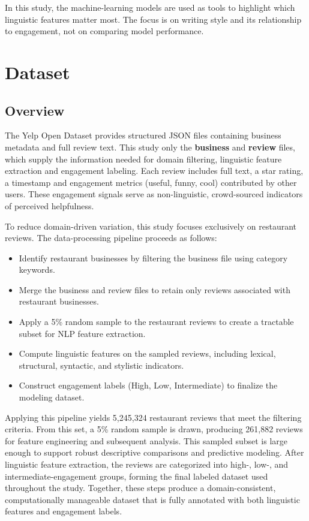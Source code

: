 \documentclass[12pt]{article}
\begin{document}
In this study, the machine-learning models are used as tools to highlight which linguistic features matter most. 
The focus is on writing style and its relationship to engagement, not on comparing model performance.



\section{Dataset}

\subsection{Overview}

The Yelp Open Dataset provides structured JSON files containing business metadata and full review text. 
This study only the \textbf{business} and \textbf{review} files, which supply the information needed for domain filtering,  
linguistic feature extraction and engagement labeling. Each review includes full text, a star rating, 
a timestamp and engagement metrics (useful, funny, cool) contributed by other users. 
These engagement signals serve as non-linguistic, crowd-sourced indicators of perceived helpfulness.  

To reduce domain-driven variation, this study focuses exclusively on restaurant reviews. The data-processing pipeline proceeds as follows:

\begin{itemize}
\item Identify restaurant businesses by filtering the business file using category keywords.
\item Merge the business and review files to retain only reviews associated with restaurant businesses.
\item Apply a 5\% random sample to the restaurant reviews to create a tractable subset for NLP feature extraction.
\item Compute linguistic features on the sampled reviews, including lexical, structural, syntactic, and stylistic indicators.
\item Construct engagement labels (High, Low, Intermediate) to finalize the modeling dataset.
\end{itemize}

Applying this pipeline yields 5,245,324 restaurant reviews that meet the filtering criteria. From this set, a 5\% random sample is drawn, producing 261,882 reviews for feature engineering and subsequent analysis. This sampled subset is large enough to support robust descriptive comparisons and predictive modeling. After linguistic feature extraction, the reviews are categorized into high-, low-, and intermediate-engagement groups, forming the final labeled dataset used throughout the study. Together, these steps produce a domain-consistent, computationally manageable dataset that is fully annotated with both linguistic features and engagement labels.
\end{document}
